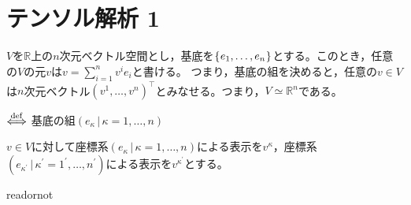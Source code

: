 \documentclass[uplatex]{jsarticle}
\begin{document}
\fi

\section{テンソル解析 1}
$V$を$\mathbb{R}$上の$n$次元ベクトル空間とし，基底を$\Set{\hspace{-1.8pt} e_{1}, \dots, e_{n} \hspace{-1.8pt}}$とする。このとき，任意の$V$の元$v$は${\displaystyle v = \sum_{i=1}^{n} v^{i}e_{i}}$と書ける。
つまり，基底の組を決めると，任意の$v \in V$は$n$次元ベクトル$(v^{1} , \dots, v^{n})^{\top}$とみなせる。つまり，$V \simeq \mathbb{R}^{n}$である。

\begin{teigi}
   $\overset{\mathrm{def}}{\Longleftrightarrow}$ 基底の組$(e_{\kappa} \,|\, \kappa = 1,\dots, n)$
\end{teigi}

$v \in V$に対して座標系$(e_{\kappa} \,|\, \kappa = 1,\dots, n)$による表示を$v^{\kappa}$，座標系$(e_{\kappa^{\prime}} \,|\, \kappa^{\prime} = 1^{\prime},\dots, n^{\prime})$による表示を$v^{\kappa^{\prime}}$とする。

\expandafter\ifx\csname readornot\endcsname\relax
  
\end{document}
